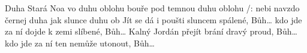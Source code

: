 \begin{TEXT}{Duha}
\SLOKA Stará   Noa  vo \NL
{} duhu  oblohu   \NL
bouře  pod temnou  \NL
{} duhu  oblohu  
\REFREN  /:   nebi  \NL
navzdo černej  duha  jak slunce  \NL
{} duhu ob  
\SLOKA Jít se dá i poušti sluncem spálené, Bůh… \NL
kdo jde za ní dojde k zemi slíbené, Bůh… 
\SLOKA Kalný Jordán přejít brání dravý proud, Bůh… \NL
kdo jde za ní ten nemůže utonout, Bůh… \NL
\end{TEXT}
